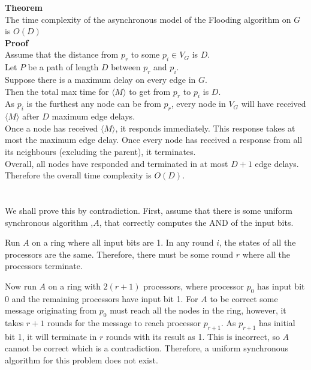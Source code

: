 \documentclass[11pt]{article}
\begin{document}
\textbf{Theorem}\\
The time complexity of the asynchronous model of the Flooding algorithm on $G$ is $O(D)$\\

\textbf{Proof}\\
Assume that the distance from $p_r$ to some $p_i \in V_G$ is $D$.\\
Let $P$ be a path of length $D$ between $p_r$ and $p_i$.\\
Suppose there is a maximum delay on every edge in $G$.\\
Then the total max time for $\langle M \rangle$ to get from $p_r$ to $p_i$ is $D$.\\
As $p_i$ is the furthest any node can be from $p_r$, every node in $V_G$ will have received $\langle M \rangle$ after $D$ maximum edge delays. \\
Once a node has received $\langle M \rangle$, it responds immediately. This response takes at most the maximum edge delay. Once every node has received a response from all its neighbours (excluding the parent), it terminates.\\
Overall, all nodes have responded and terminated in at most $D+1$ edge delays.\\
Therefore the overall time complexity is $O(D)$.


\section{}

\subsection{}

We shall prove this by contradiction.
First, assume that there is some uniform synchronous algorithm ,$A$, that correctly computes the AND of the input bits. 

Run $A$ on a ring where all input bits are 1. In any round $i$, the states of all the processors are the same. Therefore, there must be some round $r$ where all the processors terminate.

Now run $A$ on a ring with $2(r+1)$ processors, where processor $p_0$ has input bit 0 and the remaining processors have input bit 1. For $A$ to be correct some message originating from $p_0$ must reach all the nodes in the ring, however, it takes $r+1$ rounds for the message to reach processor $p_{r+1}$. As $p_{r+1}$ has initial bit 1, it will terminate in $r$ rounds with its result as 1. This is incorrect, so $A$ cannot be correct which is a contradiction. Therefore, a uniform synchronous algorithm for this problem does not exist. 
\end{document}
